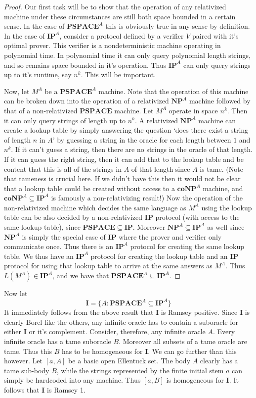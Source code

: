 \documentclass{article}
\theoremstyle{definition}
\theoremstyle{plain}
\theoremstyle{theorem}
\begin{document}
\begin{proof}
	Our first task will be to show that the operation of any relativized machine under these circumstances are still both space bounded in a certain sense. In the case of $\bm{PSPACE}^A$ this is obviously true in any sense by definition. In the case of $\bm{IP}^A$, consider a protocol defined by a verifier $V$ paired with it's optimal prover. This verifier is a nondeterministic machine operating in polynomial	time. In polynomial time it can only query polynomial length strings, and so remains space bounded in it's operation. Thus $\bm{IP}^A$ can only query strings up to it's runtime, say $n^k$. This will be important. \par 
	Now, let $M^A$ be a $\bm{PSPACE}^A$ machine. Note that the operation of this machine can be broken down into the operation of a relativized $\bm{NP}^A$ machine followed by that of a non-relativized $\bm{PSPACE}$ machine. Let $M^A$ operate in space $n^k$. Then it can only query strings of length up to $n^k$. A relativized $\bm{NP}^A$ machine can create a lookup table by simply answering the question `does there exist a string of length $n$ in $A$' by guessing a string in the oracle for each length between $1$ and $n^k$. If it can't guess a string, then there are no strings in the oracle of that length. If it can guess the right string, then it can add that to the lookup table and be content that this is all of the strings in $A$ of that length since $A$ is tame. (Note that tameness is crucial here. If we didn't have this then it would not be clear that a lookup table could be created without access to a $\bm{coNP}^A$ machine, and $\bm{coNP}^A \subseteq \bm{IP}^A$ is famously a non-relativizing result!) Now the operation of the non-relativized machine which decides the same language as $M^A$ using the lookup table can be also decided by a non-relativized $\bm{IP}$ protocol (with access to the same lookup table), since $\bm{PSPACE} \subseteq \bm{IP}$. Moreover $\bm{NP}^A \subseteq \bm{IP}^A$ as well since $\bm{NP}^A$ is simply the special case of $\bm{IP}$ where the prover and verifier only communicate once. Thus there is an $\bm{IP}^A$ protocol for creating the same lookup table. We thus have an $\bm{IP}^A$ protocol for creating the lookup table and an $\bm{IP}$ protocol for using that lookup table to arrive at the same answers as $M^A$. Thus $L(M^A) \in \bm{IP}^A$, and we have that $\bm{PSPACE}^A \subseteq \bm{IP}^A$. 
\end{proof}
Now let 
\[ \bm{I} = \{A: \bm{PSPACE}^A \subseteq \bm{IP}^A\} \]
It immediately follows from the above result that $\bm{I}$ is Ramsey positive. Since $\bm{I}$ is clearly Borel like the others, any infinite oracle has to contain a suboracle for either $\bm{I}$ or it's complement. Consider, therefore, any infinite oracle $A$. Every infinite oracle has a tame suboracle $B$. Moreover all subsets of a tame oracle are tame. Thus this $B$ has to be homogeneous for $\bm{I}$. We can go further than this however. Let $[a,A]$ be a basic open Ellentuck set. The body $A$ clearly has a tame sub-body $B$, while the strings represented by the finite initial stem $a$ can simply be hardcoded into any machine. Thus $[a,B]$ is homogeneous for $\bm{I}$. It follows that $\bm{I}$ is Ramsey 1. 
\end{document}
